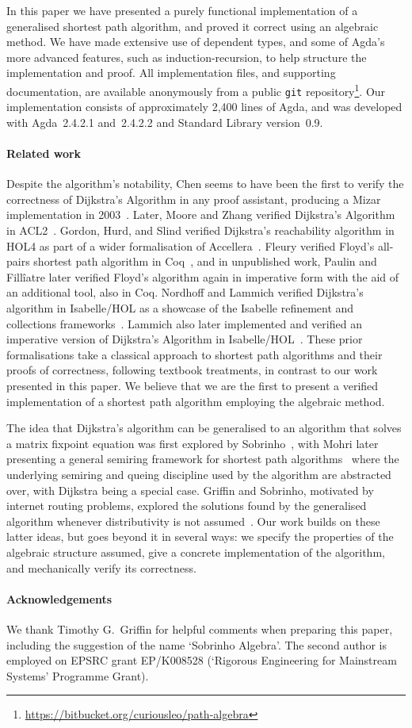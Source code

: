 In this paper we have presented a purely functional implementation of a generalised shortest path algorithm, and proved it correct using an algebraic method.
We have made extensive use of dependent types, and some of Agda's more advanced features, such as induction-recursion, to help structure the implementation and proof.
All implementation files, and supporting documentation, are available anonymously from a public \texttt{git} repository\footnote{\url{https://bitbucket.org/curiousleo/path-algebra}}.
Our implementation consists of approximately 2,400 lines of Agda, and was developed with Agda~2.4.2.1 and~2.4.2.2 and Standard Library version~0.9.

\paragraph{Related work} Despite the algorithm's notability, Chen seems to have been the first to verify the correctness of Dijkstra's Algorithm in any proof assistant, producing a Mizar implementation in 2003~\cite{chen:dijkstra:2003}.
Later, Moore and Zhang verified Dijkstra's Algorithm in ACL2~\cite{moore:proof-pearl:2005}.
Gordon, Hurd, and Slind verified Dijkstra's reachability algorithm in HOL4 as part of a wider formalisation of Accellera~\cite{gordon:executing:2003}.
Fleury verified Floyd's all-pairs shortest path algorithm in Coq~\cite{fleury:implantation:1990}, and in unpublished work, Paulin and Fill\^iatre later verified Floyd's algorithm again in imperative form with the aid of an additional tool, also in Coq.
Nordhoff and Lammich verified Dijkstra's algorithm in Isabelle/HOL as a showcase of the Isabelle refinement and collections frameworks~\cite{nordhoff-dijkstra-2012}.
Lammich also later implemented and verified an imperative version of Dijkstra's Algorithm in Isabelle/HOL~\cite{lammich:refinement:2015}.
These prior formalisations take a classical approach to shortest path algorithms and their proofs of correctness, following textbook treatments, in contrast to our work presented in this paper.
We believe that we are the first to present a verified implementation of a shortest path algorithm employing the algebraic method.

The idea that Dijkstra's algorithm can be generalised to an algorithm that solves a matrix fixpoint equation was first explored by Sobrinho~\cite{sobrinho_algebra_2001}, with Mohri later presenting a general semiring framework for shortest path algorithms~\cite{mohri:semiring:2002} where the underlying semiring and queing discipline used by the algorithm are abstracted over, with Dijkstra being a special case.
Griffin and Sobrinho, motivated by internet routing problems, explored the solutions found by the generalised algorithm whenever distributivity is not assumed~\cite{sobrinho_routing_2010}.
Our work builds on these latter ideas, but goes beyond it in several ways: we specify the properties of the algebraic structure assumed, give a concrete implementation of the algorithm, and mechanically verify its correctness.

\paragraph{Acknowledgements} We thank Timothy G.~Griffin for helpful comments when preparing this paper, including the suggestion of the name `Sobrinho Algebra'.
The second author is employed on EPSRC grant EP/K008528 (`Rigorous Engineering for Mainstream Systems' Programme Grant).
